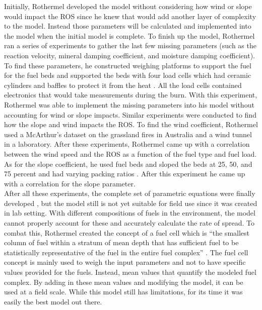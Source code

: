 \documentclass{article}
\begin{document}
\indent Initially, Rothermel developed the model without considering how wind or slope would impact the ROS since he knew that would add another layer of complexity to the model. Instead those parameters will be calculated and implemented into the model when the initial model is complete. To finish up the model, Rothermel ran a series of experiments to gather the last few missing parameters (such as the reaction velocity, mineral damping coefficient, and moisture damping coefficient). To find these parameters, he constructed weighing platforms to support the fuel for the fuel beds and supported the beds with four load cells which had ceramic cylinders and baffles to protect it from the heat \cite{Rothermel1972}. All the load cells contained electronics that would take measurements during the burn. With this experiment, Rothermel was able to implement the missing parameters into his model without accounting for wind or slope impacts. Similar experiments were conducted to find how the slope and wind impacts the ROS. To find the wind coefficient, Rothermel used a McArthur’s dataset on the grassland fires in Australia and a wind tunnel in a laboratory. After these experiments, Rothermel came up with a correlation between the wind speed and the ROS as a function of the fuel type and fuel load. As for the slope coefficient, he used fuel beds and sloped the beds at 25, 50, and 75 percent and had varying packing ratios \cite{Rothermel1972}. After this experiment he came up with a correlation for the slope parameter. \\
\indent After all these experiments, the complete set of parametric equations were finally developed \cite{Rothermel1972}, but the model still is not yet suitable for field use since it was created in lab setting. With different compositions of fuels in the environment, the model cannot properly account for these and accurately calculate the rate of spread. To combat this, Rothermel created the concept of a fuel cell which is “the smallest column of fuel within a stratum of mean depth that has sufficient fuel to be statistically representative of the fuel in the entire fuel complex” \cite{Rothermel1972}. The fuel cell concept is mainly used to weigh the input parameters and not to have specific values provided for the fuels. Instead, mean values that quantify the modeled fuel complex. By adding in these mean values and modifying the model, it can be used at a field scale. While this model still has limitations, for its time it was easily the best model out there. \\
\end{document}
